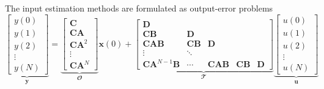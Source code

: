 \documentclass[presentation]{beamer}
\begin{document}
\begin{frame}[label={slide:preliminaries1}]{The input estimation methods are \linebreak formulated as output-error problems}
    \begin{equation*} \underbrace{ \begin{bmatrix} y(0) \\ y(1) \\ y(2) \\ \vdots \\ y(N) \end{bmatrix} }_{\mathbf{y}}  = \underbrace{ \begin{bmatrix} \mathbf{C} \\ \mathbf{C} \mathbf{A} \\ \mathbf{C} \mathbf{A}^2 \\ \vdots \\ \mathbf{C} \mathbf{A}^N \end{bmatrix} }_{\mathbfcal{O}} \mathbf{x}(0) + \underbrace{ \begin{bmatrix} \mathbf{D} \\ \mathbf{C} \mathbf{B} & \mathbf{D} \\ \mathbf{C} \mathbf{A} \mathbf{B} & \mathbf{C} \mathbf{B} & \mathbf{D} \\ \vdots & \ddots \\ \mathbf{C} \mathbf{A}^{N-1} \mathbf{B} & \cdots  &  \mathbf{C} \mathbf{A} \mathbf{B} & \mathbf{C} \mathbf{B} & \mathbf{D} \end{bmatrix} }_{\mathbfcal{T}} \underbrace{ \begin{bmatrix} u(0) \\ u(1) \\ u(2) \\ \vdots \\ u(N) \end{bmatrix} }_{\mathbf{u}} \end{equation*}
\end{frame}
\end{document}
